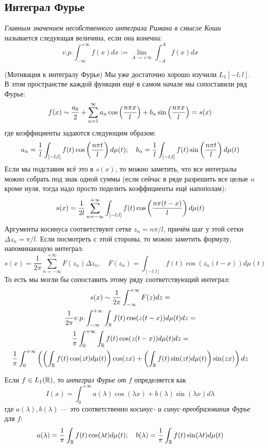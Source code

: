 \subsection{Интеграл Фурье}

\begin{reminder}
	\textit{Главным значением несобственного интеграла Римана в смысле Коши} называется следующая величина, если она конечна:
	\[
		v.p. \int_{-\infty}^{+\infty} f(x)dx := \lim_{A \to +\infty} \int_{-A}^A f(x)dx
	\]
\end{reminder}

\begin{note} (Мотивация к интегралу Фурье)
	Мы уже достаточно хорошо изучили $L_1[-l; l]$. В этом пространстве каждой функции ещё в самом начале мы сопоставили ряд Фурье:
	\[
		f(x) \sim \frac{a_0}{2} + \sum_{n = 1}^\infty a_n \cos\left(\frac{n\pi x}{l}\right) + b_n\sin\left(\frac{n\pi x}{l}\right) = s(x)
	\]
	где коэффициенты задаются следующим образом:
	\[
		a_n = \frac{1}{l}\int_{[-l; l]} f(t)\cos\left(\frac{n\pi t}{l}\right)d\mu(t); \quad b_n = \frac{1}{l}\int_{[-l; l]} f(t)\sin\left(\frac{n\pi t}{l}\right)d\mu(t)
	\]
	Если мы подставим всё это в $s(x)$, то можно заметить, что все интегралы можно собрать под знак одной суммы (если сейчас в ряде разрешить все целые $n$ кроме нуля, тогда надо просто поделить коэффициенты ещё напополам):
	\[
		s(x) = \frac{1}{2l} \sum_{n = -\infty}^{+\infty} \int_{[-l; l]} f(t)\cos\left(\frac{n\pi(t - x)}{l}\right)d\mu(t)
	\]
	Аргументы косинуса соответствуют сетке $z_n = n\pi / l$, причём шаг у этой сетки $\Delta z_n = \pi / l$. Если посмотреть с этой стороны, то можно заметить формулу, напоминающую интеграл:
	\[
		s(x) = \frac{1}{2\pi} \sum_{n = -\infty}^{+\infty} F(z_n)\Delta z_n, \quad F(z_n) = \int_{[-l; l]} f(t)\cos(z_n(t - x))d\mu(t)
	\]
	То есть мы могли бы сопоставить этому ряду соответствующий интеграл:
	\begin{multline*}
		s(x) \sim \frac{1}{2\pi} \int_{-\infty}^{+\infty} F(z)dz =
		\\
		\frac{1}{2\pi} v.p. \int_{-\infty}^{+\infty} \int_{\mathbb{R}} f(t)\cos(z(t - x))d\mu(t)dz =
		\\
		\frac{1}{\pi} \int_0^{+\infty} \int_{\mathbb{R}} f(t)\cos(z(t - x))d\mu(t)dz =
		\\
		\frac{1}{\pi} \int_0^{+\infty} \left(\left(\int_{\mathbb{R}} f(t)\cos(zt)d\mu(t)\right)\cos(zx) + \left(\int_{\mathbb{R}} f(t)\sin(zt)d\mu(t)\right)\sin(zx)\right)dz
	\end{multline*}
\end{note}

\begin{definition}
	Если $f \in L_1(\mathbb{R})$, то \textit{интеграл Фурье от $f$} определяется как
	\[
		I(x) = \int_0^{+\infty} a(\lambda)\cos(\lambda x) + b(\lambda)\sin(\lambda x)d\lambda
	\]
	где $a(\lambda), b(\lambda)$ --- это соответственно \textit{косинус- и синус-преобразования Фурье} для $f$:
	\[
		a(\lambda) = \frac{1}{\pi} \int_{\mathbb{R}} f(t)\cos(\lambda t)d\mu(t); \quad b(\lambda) = \frac{1}{\pi} \int_{\mathbb{R}} f(t)\sin(\lambda t)d\mu(t)
	\]
\end{definition}


